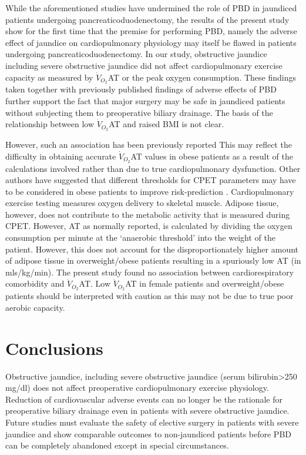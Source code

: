 While the aforementioned studies have undermined the role of PBD in jaundiced patients undergoing pancreaticoduodenectomy, the results of the present study show for the first time that the premise for performing PBD, namely the adverse effect of jaundice on cardiopulmonary physiology may itself be flawed in patients undergoing pancreaticoduodenectomy. 
In our study, obstructive jaundice including severe obstructive jaundice did not affect cardiopulmonary exercise capacity as measured by $\dot{V}_{O_2}$AT or the peak oxygen consumption. 
These findings taken together with previously published findings of adverse effects of PBD further support the fact that major surgery may be safe in jaundiced patients without subjecting them to preoperative biliary drainage. 
The basis of the relationship between low $\dot{V}_{O_2}$AT and raised BMI is not clear. 

However, such an association has been previously reported \parencite{horwich_relationship_2009}  This may reflect the difficulty in obtaining accurate $\dot{V}_{O_2}$AT values in obese patients as a result of the calculations involved rather than due to true cardiopulmonary dysfunction. 
Other authors have suggested that different thresholds for CPET parameters may have to be considered in obese patients to improve risk-prediction \parencite{donnelly_criteria_1990,hulens_exercise_2001}. 
Cardiopulmonary exercise testing measures oxygen delivery to skeletal muscle. 
Adipose tissue, however, does not contribute to the metabolic activity that is measured during CPET. 
However, AT as normally reported, is calculated by dividing the oxygen consumption per minute at the ‘anaerobic threshold' into the weight of the patient. 
However, this does not account for the disproportionately higher amount of adipose tissue in overweight/obese patients resulting in a spuriously low AT (in mls/kg/min). 
The present study found no association between cardiorespiratory comorbidity and $\dot{V}_{O_2}$AT. 
Low $\dot{V}_{O_2}$AT in female patients and overweight/obese patients should be interpreted with caution as this may not be due to true poor aerobic capacity.

\section{Conclusions}
Obstructive jaundice, including severe obstructive jaundice (serum bilirubin>250 mg/dl) does not affect preoperative cardiopulmonary exercise physiology. 
Reduction of cardiovascular adverse events can no longer be the rationale for preoperative biliary drainage even in patients with severe obstructive jaundice. 
Future studies must evaluate the safety of elective surgery in patients with severe jaundice and show comparable outcomes to non-jaundiced patients before PBD can be completely abandoned except in special circumstances.